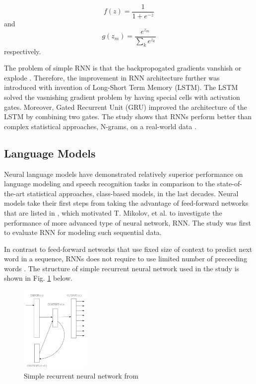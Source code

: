 \documentclass{IEEEtran}
\begin{document}
\begin{equation}
	f(z) = \frac{1}{1+e^{-z}}
\end{equation}
and
\begin{equation}
	g(z_m) = \frac{e^{z_m}}{\sum_k{e^{z_k}}}
\end{equation}
respectively.

The problem of simple RNN is that the backpropogated gradients vanshish or explode \cite{rnn}. Therefore, the improvement in RNN architecture further was introduced with invention of Long-Short Term Memory (LSTM). The LSTM solved the vasnishing gradient problem by having special cells with activation gates. Moreover, Gated Recurrent Unit (GRU) improved the architecture of the LSTM by combining two gates. The study shows that RNNs perform better than complex statistical approaches, N-grams, on a real-world data \cite{rnn}.

\subsection{Language Models}

Neural language models have demonstrated relatively superior performance on language modeling and speech recognition tasks in comparison to the state-of-the-art statistical approaches, class-based models, in the last decades. Neural models take their first steps from taking the advantage of feed-forward networks that are listed in \cite{Mikolov2010NeuralLM}, which motivated T. Mikolov, et al. to investigate the performance of more advanced type of neural network, RNN. The study was first to evaluate RNN for modeling such sequential data.

In contrast to feed-forward networks that use fixed size of context to predict next word in a sequence, RNNs does not require to use limited number of preceeding words \cite{Mikolov2010NeuralLM}. The structure of simple recurrent neural network used in the study is shown in Fig. \ref{fig:rnn} below.

\begin{figure}[h]
	\centering
	\includegraphics[width=0.3\textwidth]{rnn}
	\caption{Simple recurrent neural network from \cite{Mikolov2010NeuralLM}}
	\label{fig:rnn}
\end{figure}
\end{document}
